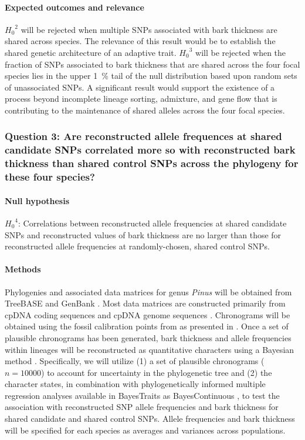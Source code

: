 \paragraph{Expected outcomes and relevance} ${H_0}^2$ will be rejected when multiple SNPs associated 
with bark thickness are shared across species. The relevance of this result would be to establish the shared genetic 
architecture of an adaptive trait. ${H_0}^3$ will be rejected when the fraction of SNPs associated to bark thickness that are 
shared across the four focal species lies in the upper \SI{1}{\percent} tail of the null distribution based upon random sets of 
unassociated SNPs. A significant result would support the existence of a process beyond incomplete lineage sorting, 
admixture, and gene flow that is contributing to the maintenance of shared alleles across the four focal species. 

\subsubsection*{Question 3: Are reconstructed allele frequences at shared candidate SNPs correlated more so with 
reconstructed bark thickness than shared control SNPs across the phylogeny for these four species?}

\paragraph{Null hypothesis} ${H_0}^4$: Correlations between reconstructed allele frequencies at shared candidate SNPs 
and reconstructed values of bark thickness are no larger than those for reconstructed allele frequencies at randomly-chosen, 
shared control SNPs.

\paragraph{Methods} Phylogenies and associated data matrices for genus \emph{Pinus} will be obtained from 
TreeBASE \citep{Morell:to} and GenBank \citep{Benson:2012kf}. Most data matrices are constructed primarily from 
cpDNA coding sequences \citep{Eckert:2006iw, Gernandt:2008df} and cpDNA genome sequences \citep{Parks:2009bd}. 
Chronograms will be obtained using the fossil calibration points from \citet{Willyard:2007in} as presented in \citet{He:2012bz}. 
Once a set of plausible chronograms has been 
generated, bark thickness and allele frequencies within lineages will be reconstructed as quantitative 
characters using a Bayesian method \citep{Pagel:2004ic}.
Specifically, we will utilize (1) a set of plausible chronograms ($n =  \num{10000}$) to account for uncertainty in the 
phylogenetic tree and (2) the character states, in combination with phylogenetically informed multiple 
regression analyses available in BayesTraits as BayesContinuous \citep{Pagel:2004ic},  to test the association with 
reconstructed SNP allele frequencies and bark thickness for shared candidate and shared control SNPs. 
Allele frequencies and bark thickness will be specified for each species as averages and variances across populations.


